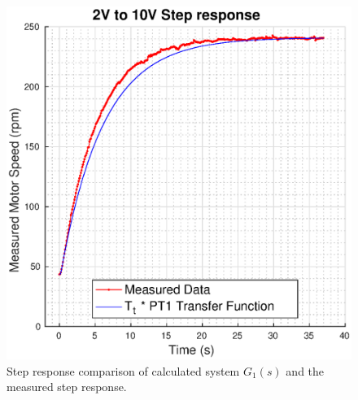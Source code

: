 \begin{figure}
    \centering
    \includegraphics[width=\linewidth]{images/Tt_PT1}
    \caption{Step response comparison of calculated system $G_1(s)$ and the measured step response.}
    \label{fig:Tt_PT1_step}
\end{figure}

